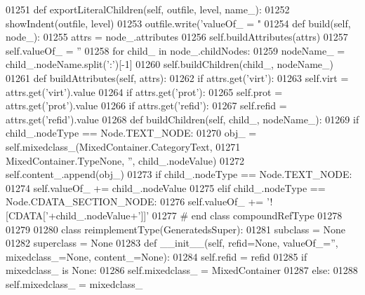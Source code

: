 \begin{DoxyCode}
{{{{{{{{{{{{{{{{{{{{{{{{{{{{{{{{{{{{{{{{{{{{{{{{{{{{{{{{{{{{{{{{{{{{{{{01251     \textcolor{keyword}{def }exportLiteralChildren(self, outfile, level, name\_):
01252         showIndent(outfile, level)
01253         outfile.write(\textcolor{stringliteral}{'valueOf\_ = "%
01254     \textcolor{keyword}{def }build(self, node\_):
01255         attrs = node\_.attributes
01256         self.buildAttributes(attrs)
01257         self.valueOf_ = \textcolor{stringliteral}{''}
01258         \textcolor{keywordflow}{for} child\_ \textcolor{keywordflow}{in} node\_.childNodes:
01259             nodeName\_ = child\_.nodeName.split(\textcolor{stringliteral}{':'})[-1]
01260             self.buildChildren(child\_, nodeName\_)
01261     \textcolor{keyword}{def }buildAttributes(self, attrs):
01262         \textcolor{keywordflow}{if} attrs.get(\textcolor{stringliteral}{'virt'}):
01263             self.virt = attrs.get(\textcolor{stringliteral}{'virt'}).value
01264         \textcolor{keywordflow}{if} attrs.get(\textcolor{stringliteral}{'prot'}):
01265             self.prot = attrs.get(\textcolor{stringliteral}{'prot'}).value
01266         \textcolor{keywordflow}{if} attrs.get(\textcolor{stringliteral}{'refid'}):
01267             self.refid = attrs.get(\textcolor{stringliteral}{'refid'}).value
01268     \textcolor{keyword}{def }buildChildren(self, child\_, nodeName\_):
01269         \textcolor{keywordflow}{if} child\_.nodeType == Node.TEXT\_NODE:
01270             obj\_ = self.mixedclass_(MixedContainer.CategoryText,
01271                 MixedContainer.TypeNone, \textcolor{stringliteral}{''}, child\_.nodeValue)
01272             self.content\_.append(obj\_)
01273         \textcolor{keywordflow}{if} child\_.nodeType == Node.TEXT\_NODE:
01274             self.valueOf_ += child\_.nodeValue
01275         \textcolor{keywordflow}{elif} child\_.nodeType == Node.CDATA\_SECTION\_NODE:
01276             self.valueOf_ += \textcolor{stringliteral}{'![CDATA['}+child\_.nodeValue+\textcolor{stringliteral}{']]'}
01277 \textcolor{comment}{# end class compoundRefType}
01278 
01279 
01280 \textcolor{keyword}{class }reimplementType(GeneratedsSuper):
01281     subclass = \textcolor{keywordtype}{None}
01282     superclass = \textcolor{keywordtype}{None}
01283     \textcolor{keyword}{def }__init__(self, refid=None, valueOf\_='', mixedclass\_=None, content\_=None):
01284         self.refid = refid
01285         \textcolor{keywordflow}{if} mixedclass\_ \textcolor{keywordflow}{is} \textcolor{keywordtype}{None}:
01286             self.mixedclass_ = MixedContainer
01287         \textcolor{keywordflow}{else}:
01288             self.mixedclass_ = mixedclass\_
}}}}}}}}}}}}}}}}}}}}}}}}}}}}}}}}}}}}}}}}}}}}}}}}}}}}}}}}}}}}}}}}}}}}}}}}
\end{DoxyCode}
